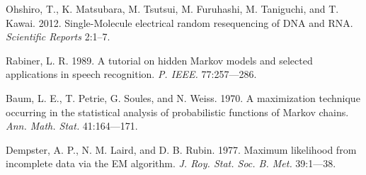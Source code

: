 \documentclass{biophys_letter}
\begin{document}
\begin{thebibliography}{99}
  Ohshiro, T., K. Matsubara, M. Tsutsui, M. Furuhashi, M. Taniguchi, and T. Kawai.
  2012.
  Single-Molecule electrical random resequencing of DNA and RNA.
  {\it Scientific Reports}
  2:1--7.

  Rabiner, L. R.
  1989.
  A tutorial on hidden Markov models and selected applications in speech recognition.
  {\it P. IEEE.}
  77:257---286.

  Baum, L. E., T. Petrie, G. Soules, and N. Weiss.
  1970.
  A maximization technique occurring in the statistical analysis of probabilistic functions of Markov chains.
  {\it Ann. Math. Stat.}
  41:164---171.

  Dempster, A. P., N. M. Laird, and D. B. Rubin.
  1977.
  Maximum likelihood from incomplete data via the EM algorithm.
  {\it J. Roy. Stat. Soc. B. Met.}
  39:1---38.

\end{thebibliography}
\end{document}
